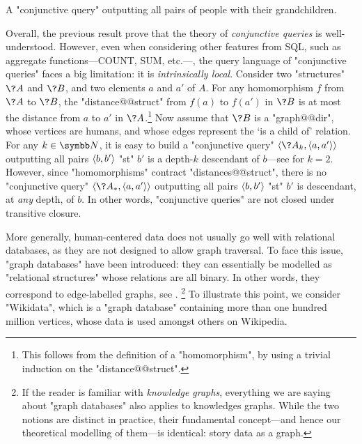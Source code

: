 \begin{marginfigure}
	\centering
	\caption{
		\AP\label{fig:CQ-grandchild}
		A "conjunctive query" outputting all pairs of people with their grandchildren.
	}
\end{marginfigure}
Overall, the previous result prove that the theory of \emph{conjunctive queries} is well-understood.
However, even when considering other features from SQL, such as aggregate functions---\textsf{COUNT}, \textsf{SUM}, etc.---, the query language of "conjunctive queries" faces a big limitation:
it is \emph{intrinsically local}.
Consider two "structures" $\?A$ and $\?B$, and two elements $a$ and $a'$ of $A$.
For any homomorphism $f$ from $\?A$ to $\?B$, the "distance@@struct" from $f(a)$ to $f(a')$
in $\?B$ is at most the distance from $a$ to $a'$ in $\?A$.\footnote{This follows from
the definition of a "homomorphism", by using a trivial induction on the "distance@@struct".}
Now assume that $\?B$ is a "graph@@dir", whose vertices are humans,
and whose edges represent the `is a child of' relation.
For any $k\in\N$, it is easy to build a "conjunctive query" $\tup{\?A_k, \tup{a, a'}}$
outputting all pairs $\langle b,b'\rangle$ "st" $b'$ is a depth-$k$ descendant of $b$---see
 for $k=2$.
However, since "homomorphisms" contract "distances@@struct", there is no
"conjunctive query" $\tup{\?A_*, \tup{a, a'}}$ outputting all pairs $\langle b,b'\rangle$
"st" $b'$ is descendant, at \emph{any} depth, of $b$.
In other words, "conjunctive queries" are not closed under transitive closure.

More generally, human-centered data does not usually go well with
relational databases, as they are not designed to allow graph traversal.
To face this issue, "graph databases" have
been introduced: they can essentially be modelled
as "relational structures" whose relations are all binary. In other
words, they correspond to edge-labelled graphs, see .
\footnote{If the reader is familiar with \emph{knowledge graphs},
everything we are saying about "graph databases" also applies
to knowledges graphs. While the two notions are distinct in practice,
their fundamental concept---and hence our theoretical modelling of them---is identical:
story data as a graph.}
To illustrate this point, we consider
"Wikidata", which is a "graph database" containing more than one hundred million
vertices, whose data is used amongst others on Wikipedia. 

